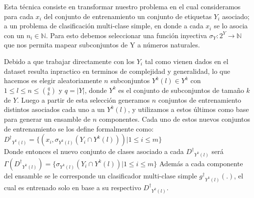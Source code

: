 \documentclass{article}
\begin{document}
        
        
        Esta técnica consiste en transformar nuestro problema en el cual consideramos para cada $x_i$ del conjunto de entrenamiento un conjunto de etiquetas $Y_i$ asociado; a un problema de clasificación multi-clase simple, en donde a cada $x_i$ se lo asocia con un $n_i \in \mathbb{N}$. Para esto debemos seleccionar una función inyectiva $\sigma_Y : 2^Y \rightarrow \mathbb{N}$ que nos permita mapear subconjuntos de Y a números naturales.
        
        Debido a que trabajar directamente con los $Y_i$ tal como vienen dados en el dataset resulta inpractico en terminos de complejidad y generalidad, lo que hacemos es elegir aleatoriamente $n$ subconjuntos $Y^{k} (l) \in Y^{k}$ con $1\leq l\leq n \leq \binom{q}{k}$ y $q = |Y|$, donde $Y^{k}$ es el conjunto de subconjuntos de tamaño $k$ de $Y$. Luego a partir de esta selección generamos $n$ conjuntos de entrenamiento distintos asociados cada uno a un $Y^{k} (l)$, y utilizamos a estos últimos como base para generar un ensamble de $n$ componentes. Cada uno de estos nuevos conjuntos de entrenamiento se los define formalmente como:\\
        
        ${{D^\dagger}_{Y^{k} (l)}} = \{ (x_i,\sigma_{Y^{k} (l)} (Y_i \cap Y^{k} (l))) | 1\leq i\leq m \}$\\
        
        Donde entonces el nuevo conjunto de clases asociado a cada ${D^\dagger}_{Y^{k} (l)}$ será $\Gamma ({D^\dagger}_{Y^{k} (l)}) = \{ \sigma_{Y^{k} (l)} (Y_i \cap Y^{k} (l)) | 1\leq i\leq m \}$
        Además a cada componente del ensamble se le corresponde un clasificador multi-clase simple ${g^\dagger}_{Y^{k} (l)} (.)$, el cual es entrenado solo en base a su respectivo ${D^\dagger}_{Y^{k} (l)}$. 
        
\end{document}
